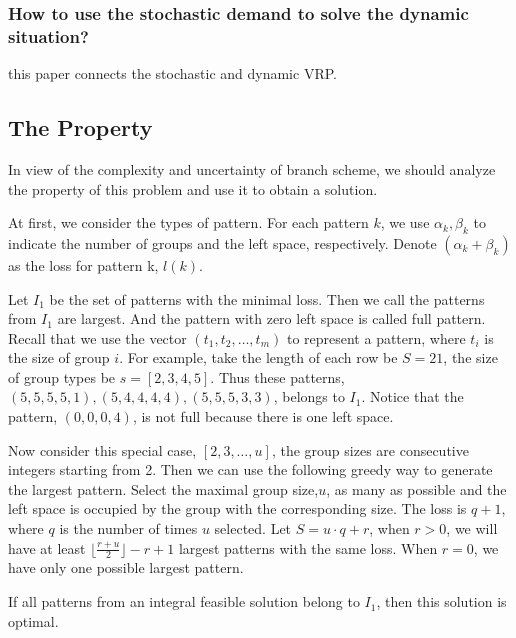 \subsubsection{How to use the stochastic demand to solve the dynamic situation?}

\cite{bent2004scenario} this paper connects the stochastic and dynamic VRP.


\subsection{The Property}
In view of the complexity and uncertainty of branch scheme, we should analyze the property of this problem and use it to obtain a solution.

At first, we consider the types of pattern. For each pattern $k$, we use $\alpha_k, \beta_k$ to indicate the number of groups and the left space, respectively. Denote $(\alpha_k + \beta_k)$ as the loss for pattern k, $l(k)$.


Let $I_1$ be the set of patterns with the minimal loss. Then we call the patterns from $I_1$ are largest. And the pattern with zero left space is called full pattern.
Recall that we use the vector $(t_1,t_2,\ldots,t_m)$ to represent a pattern, where $t_i$ is the size of group $i$. For example, take the length of each row be $S = 21$, the size of group types be $s = [2,3,4,5]$. Thus these patterns, $(5,5,5,5,1),(5,4,4,4,4),(5,5,5,3,3)$, belongs to $I_1$. Notice that the pattern, $(0,0,0,4)$, is not full because there is one left space.

Now consider this special case, $[2,3,\ldots,u]$, the group sizes are consecutive integers starting from 2. Then we can use the following greedy way to generate the largest pattern. Select the maximal group size,$u$, as many as possible and the left space is occupied by the group with the corresponding size. The loss is $q+1$, where $q$ is the number of times $u$ selected. Let $S = u\cdot q + r$, when $r>0$, we will have at least $\lfloor \frac{r+u}{2} \rfloor -r +1$ largest patterns with the same loss. When $r =0$, we have only one possible largest pattern.

\begin{lem}
If all patterns from an integral feasible solution belong to $I_1$, then this solution is optimal.
\end{lem}

